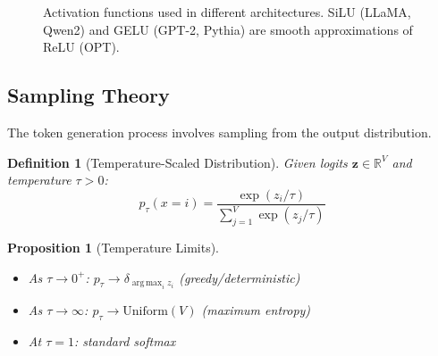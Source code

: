 \documentclass[12pt,a4paper]{article}
\newtheorem{definition}{Definition}[section]
\newtheorem{proposition}[theorem]{Proposition}
\DeclareMathOperator*{\argmax}{arg\,max}
\begin{document}
\begin{figure}[H]
\centering
{}
\caption{Activation functions used in different architectures. SiLU (LLaMA, Qwen2) and GELU (GPT-2, Pythia) are smooth approximations of ReLU (OPT).}
\label{fig:activations}
\end{figure}

\subsection{Sampling Theory}

The token generation process involves sampling from the output distribution.

\begin{definition}[Temperature-Scaled Distribution]
Given logits $\bm{z} \in \mathbb{R}^V$ and temperature $\tau > 0$:
\begin{equation}
p_\tau(x = i) = \frac{\exp(z_i / \tau)}{\displaystyle\sum_{j=1}^{V} \exp(z_j / \tau)}
\label{eq:temperature}
\end{equation}
\end{definition}

\begin{proposition}[Temperature Limits]
\begin{itemize}[nosep]
    \item As $\tau \to 0^+$: $p_\tau \to \delta_{\argmax_i z_i}$ (greedy/deterministic)
    \item As $\tau \to \infty$: $p_\tau \to \text{Uniform}(V)$ (maximum entropy)
    \item At $\tau = 1$: standard softmax
\end{itemize}
\end{proposition}
\end{document}
